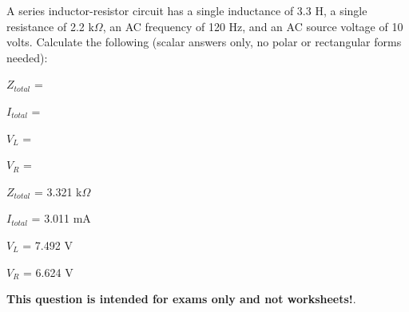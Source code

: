 

A series inductor-resistor circuit has a single inductance of 3.3 H, a single resistance of 2.2 k$\Omega$, an AC frequency of 120 Hz, and an AC source voltage of 10 volts.  Calculate the following (scalar answers only, no polar or rectangular forms needed):

\vskip 10pt

$Z_{total}$ =

\vskip 10pt

$I_{total}$ = 

\vskip 10pt

$V_{L}$ = 

\vskip 10pt

$V_{R}$ = 







$Z_{total}$ = 3.321 k$\Omega$

\vskip 10pt

$I_{total}$ = 3.011 mA

\vskip 10pt

$V_{L}$ = 7.492 V

\vskip 10pt

$V_{R}$ = 6.624 V







{\bf This question is intended for exams only and not worksheets!}.



